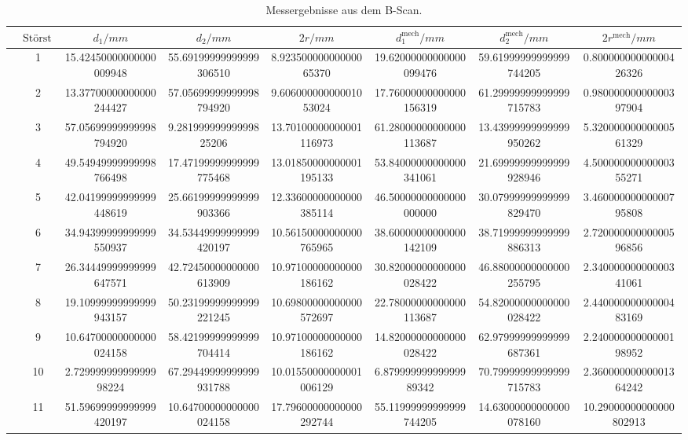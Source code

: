 \begin{table}
        \caption{Messergebnisse aus dem B-Scan.}
        \centering
        \label{tab:b}
        \begin{tabular}{l@{}S[round-mode=off, table-format=2.0] S[table-format=2.2, round-precision=2, round-mode=places] S[table-format=2.2, round-precision=2, round-mode=places] S[table-format=2.2, round-precision=2, round-mode=places] S[table-format=2.2, round-precision=2, round-mode=places] S[table-format=2.2, round-precision=4, round-mode=figures] S[table-format=2.2, round-precision=2, round-mode=places] } \toprule & {$\text{Störstelle}$}& {$d_1/\si{mm}$}& {$d_2/\si{mm}$}& {$2r/\si{mm}$}& {$d_1^\text{mech}/\si{mm}$}& {$d_2^\text{mech}/\si{mm}$}& {$2r^\text{mech}/\si{mm}$}\\\midrule
& 1 & 15.42450000000000009948 & 55.69199999999999306510 & 8.92350000000000065370 & 19.62000000000000099476 & 59.61999999999999744205 & 0.80000000000000426326 \\
& 2 & 13.37700000000000244427 & 57.05699999999998794920 & 9.60600000000001053024 & 17.76000000000000156319 & 61.29999999999999715783 & 0.98000000000000397904 \\
& 3 & 57.05699999999998794920 & 9.28199999999999825206 & 13.70100000000001116973 & 61.28000000000000113687 & 13.43999999999999950262 & 5.32000000000000561329 \\
& 4 & 49.54949999999998766498 & 17.47199999999999775468 & 13.01850000000001195133 & 53.84000000000000341061 & 21.69999999999999928946 & 4.50000000000000355271 \\
& 5 & 42.04199999999999448619 & 25.66199999999999903366 & 12.33600000000000385114 & 46.50000000000000000000 & 30.07999999999999829470 & 3.46000000000000795808 \\
& 6 & 34.94399999999999550937 & 34.53449999999999420197 & 10.56150000000000765965 & 38.60000000000000142109 & 38.71999999999999886313 & 2.72000000000000596856 \\
& 7 & 26.34449999999999647571 & 42.72450000000000613909 & 10.97100000000000186162 & 30.82000000000000028422 & 46.88000000000000255795 & 2.34000000000000341061 \\
& 8 & 19.10999999999999943157 & 50.23199999999999221245 & 10.69800000000000572697 & 22.78000000000000113687 & 54.82000000000000028422 & 2.44000000000000483169 \\
& 9 & 10.64700000000000024158 & 58.42199999999999704414 & 10.97100000000000186162 & 14.82000000000000028422 & 62.97999999999999687361 & 2.24000000000000198952 \\
& 10 & 2.72999999999999998224 & 67.29449999999999931788 & 10.01550000000001006129 & 6.87999999999999989342 & 70.79999999999999715783 & 2.36000000000001364242 \\
& 11 & 51.59699999999999420197 & 10.64700000000000024158 & 17.79600000000000292744 & 55.11999999999999744205 & 14.63000000000000078160 & 10.29000000000000802913 \\
 \bottomrule \end{tabular} \end{table}
